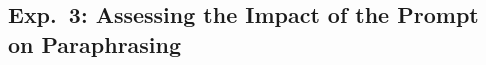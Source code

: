 \subsection{Exp.\ 3: Assessing the Impact of the Prompt on Paraphrasing}
\label{subsec:prompt_impact}


